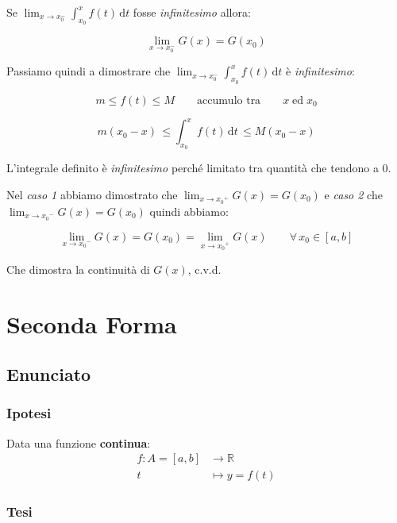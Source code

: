 \documentclass[../dimostrazioni]{subfiles}
\begin{document}
                    Se \( \lim_{x \to x_0^-} \int_{x_0}^x \! f(t) \, \mathrm{d}t \) fosse \emph{infinitesimo} allora:

                    \[  \lim_{x \to x_0^-}G(x) = G(x_0) \]

                    Passiamo quindi a dimostrare che \( \lim_{x \to x_0^-} \int_{x_0}^x \! f(t) \, \mathrm{d}t \) è \emph{infinitesimo}:

                    \[m \leqslant f(t) \leqslant M \qquad \text {accumulo tra} \qquad x \; \text{ed} \; x_0 \]

                    \[m(x_0-x) \, \leqslant \int_{x_0}^x \! f(t) \, \mathrm{d}t \, \leqslant M(x_0-x) \]

                    L'integrale definito è \emph{infinitesimo} perché limitato tra quantità che tendono a 0.

                Nel \emph{caso 1} abbiamo dimostrato che \(  \lim_{x \to {x_0}^{+}}G(x) = G(x_0) \) e \emph{caso 2} che \(  \lim_{x \to {x_0}^{-}}G(x) = G(x_0) \) quindi abbiamo:

                \[  \lim_{x \to {x_0}^{-}}G(x) = G(x_0) = \lim_{x \to {x_0}^{+}}G(x) \qquad \forall \, x_0 \in [a, b] \]

                Che dimostra la continuità di \(G(x)\), c.v.d.
            
            \section*{Seconda Forma}

                \subsection*{Enunciato}

                    \subsubsection*{Ipotesi}

                        Data una funzione \textbf{continua}:
                        \begin{align*}
                            f : A = [a, b] &\longrightarrow \mathbb{R}\\
                            t &\longmapsto y = f(t) 
                        \end{align*}

                    \subsubsection*{Tesi}
                    
\end{document}
